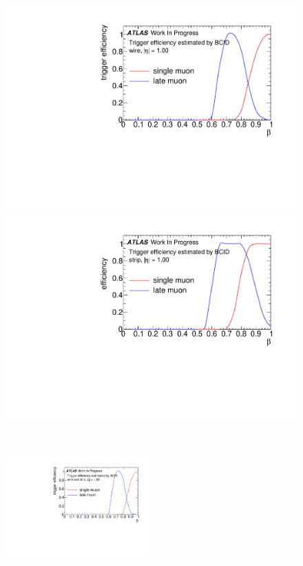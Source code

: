 \begin{figure}[tbp]
    \begin{minipage}{0.49\hsize}
    \centering   
    \includegraphics[width=\textwidth,page=5]{img/rec/eff_wire.pdf}
    \subcaption{}
    \end{minipage}
    \begin{minipage}{0.49\hsize}
    \centering   
    \includegraphics[width=\textwidth,page=5]{img/rec/eff_strip.pdf}
    \subcaption{}
    \end{minipage} \\
    \begin{minipage}{0.99\hsize}
    \centering   
    \includegraphics[width=0.5\textwidth,page=5]{img/rec/eff_both.pdf}

\end{minipage}
\end{figure}
